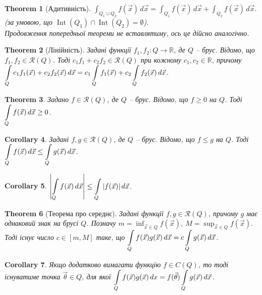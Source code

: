 \documentclass[a4paper, 10pt]{article}
\theoremstyle{theoremdd}
\newtheorem{theorem}{Theorem}[subsection]
\theoremstyle{theoremdd}
\theoremstyle{theoremdd}
\theoremstyle{theoremdd}
\theoremstyle{theoremdd}
\theoremstyle{theoremdd}
\theoremstyle{theoremdd}
\theoremstyle{theoremdd}
\theoremstyle{theoremdd}
\theoremstyle{theoremdd}
\theoremstyle{theoremdd}
\theoremstyle{theoremdd}
\theoremstyle{theoremdd}
\theoremstyle{theoremdd}
\newtheorem{corollary}[theorem]{Corollary}
\theoremstyle{theoremdd}
\DeclareMathOperator{\Int}{Int}
\begin{document}
\begin{theorem}[Адитивність]
$\displaystyle\int_{Q_1 \cup Q_2} f(\vec{x})\,d\vec{x} = \int_{Q_1} f(\vec{x})\,d\vec{x} + \int_{Q_2} f(\vec{x})\,d\vec{x}$. \qquad (за умовою, що $\Int(Q_1) \cap \Int(Q_2) = \emptyset$).\\
\textit{Продовження попередньої теореми не вставлятиму, ось це дійсно аналогічно.}
\end{theorem}

\begin{theorem}[Лінійність]
Задані функції $f_1,f_2 \colon Q \to \mathbb{R}$, де $Q$ -- брус. Відомо, що $f_1,f_2 \in \mathcal{R}(Q)$. Тоді $c_1 f_1 + c_2 f_2 \in \mathcal{R}(Q)$ при кожному $c_1,c_2 \in \mathbb{R}$, причому\\
$\displaystyle\int\displaylimits_Q c_1 f_1(\vec{x}) + c_2 f_2(\vec{x})\,d\vec{x} = c_1 \int\displaylimits_Q f_1(\vec{x}) + c_2 \int\displaylimits_Q f_2(\vec{x})\,d\vec{x}$.
\end{theorem}

\begin{theorem}
Задано $f \in \mathcal{R}(Q)$, де $Q$ -- брус. Відомо, що $f \geq 0$ на $Q$. Тоді $\displaystyle\int\displaylimits_Q f(\vec{x})\,d\vec{x} \geq 0$.
\end{theorem}

\begin{corollary}
Задані $f,g \in \mathcal{R}(Q)$, де $Q$ -- брус. Відомо, що $f \leq g$ на $Q$. Тоді $\displaystyle\int\displaylimits_Q f(\vec{x})\,d\vec{x} \leq \int\displaylimits_Q g(\vec{x})\,d\vec{x}$.
\end{corollary}

\begin{corollary}
$\displaystyle\left| \int\displaylimits_Q f(\vec{x})\,d\vec{x} \right| \leq \int\displaylimits_Q |f(\vec{x})|\,d\vec{x}$.
\end{corollary}

\begin{theorem}[Теорема про середнє]
Задані функції $f,g \in \mathcal{R}(Q)$, причому $g$ має однаковий знак на брусі $Q$. Позначу $m = \displaystyle\inf_{\vec{x} \in Q} f(\vec{x}),\ M = \sup_{\vec{x} \in Q} f(\vec{x})$. Тоді існує число $c \in [m,M]$ таке, що $\displaystyle\int\displaylimits_Q f(\vec{x})g(\vec{x})\,d\vec{x} = c \int\displaylimits_Q g(\vec{x})\,d\vec{x}$.
\end{theorem}

\begin{corollary}
Якщо додатково вимагати функцію $f \in C(Q)$, то тоді існуватиме точка $\vec{\theta} \in Q$, для якої $\displaystyle\int\displaylimits_Q f(\vec{x})g(\vec{x})\,dx = f(\vec{\theta}) \int\displaylimits_Q g(\vec{x})\,d\vec{x}$.
\end{corollary}
\end{document}
